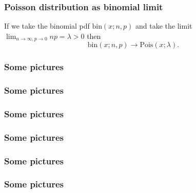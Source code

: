 \begin{frame}[fragile]\frametitle{Poisson distribution as binomial limit}


\begin{thm}

If we take the binomial pdf $\mbox{bin}(x;n,p)$ and
take the limit $\lim_{n \rightarrow \infty, p \rightarrow 0} np =
\lambda >0$ then 
$$\mbox{bin}(x;n,p) \rightarrow \mbox{Pois}(x;\lambda).$$
\end{thm}

\end{frame}


\begin{frame}[fragile]\frametitle{Some pictures}
\end{frame}

\begin{frame}[fragile]\frametitle{Some pictures}
\end{frame}

\begin{frame}[fragile]\frametitle{Some pictures}
\end{frame}

\begin{frame}[fragile]\frametitle{Some pictures}
\end{frame}

\begin{frame}[fragile]\frametitle{Some pictures}
\end{frame}

\begin{frame}[fragile]\frametitle{Some pictures}
\end{frame}




